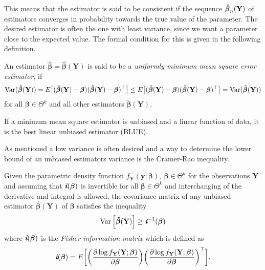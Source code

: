 This means that the estimator is said to be consistent if the sequence $\operatorname{\boldsymbol{\hat{\beta}}}_n(\textbf{Y})$ of estimators converges in probability towards the true value of the parameter. 
The desired estimator is often the one with least variance, since we want a parameter close to the expected value. 
The formal condition for this is given in the following definition.

\begin{definition} 
\label{def:minimum_mean_square_error}
An estimator $\boldsymbol{\hat{\beta}}=\boldsymbol{\hat{\beta}}(\textbf{Y})$ is said to be a \textit{uniformly minimum mean square error estimator}, if
\begin{align*}
    \operatorname{\text{Var}}(\boldsymbol{\hat{\beta}}(\textbf{Y})) = E\big[ (\boldsymbol{\hat{\beta}}(\textbf{Y})-\boldsymbol{\beta})(\boldsymbol{\hat{\beta}}(\textbf{Y})-\boldsymbol{\beta})^\top \big] \leq E\big[ (\boldsymbol{\tilde{\beta}}(\textbf{Y})-\boldsymbol{\beta})(\boldsymbol{\tilde{\beta}}(\textbf{Y})-\boldsymbol{\beta})^\top \big] = \operatorname{\text{Var}}(\boldsymbol{\tilde{\beta}}(\textbf{Y}))
\end{align*} 
for all $\boldsymbol{\beta} \in \Theta^k $ and all other estimators $\boldsymbol{\tilde{\beta}(\textbf{Y})}$.
 \end{definition}
 
If a minimum mean square estimator is unbiased and a linear function of data, it is the best linear unbiased estimator (BLUE).

As mentioned a low variance is often desired and a way to determine the lower bound of an unbiased estimators variance is the Cramer-Rao inequality.
 
 \begin{theorem} 
\label{th:cramerrao_inequality}
Given the parametric density function $f_{\textbf{Y}}(\textbf{y};\boldsymbol{\beta}), \ \boldsymbol{\beta} \in \Theta^k$ for the observations $\textbf{Y}$ and assuming that $\textit{\textbf{i}}(\boldsymbol{\beta})$ is invertible for all $\boldsymbol{\beta} \in \Theta^k$ and interchanging of the derivative and integral is allowed, the covariance matrix of any unbiased estimator $\boldsymbol{\hat{\beta}}(\textbf{Y})$ of $\boldsymbol{\beta}$ satisfies the inequality
\begin{align} \label{eq:cramerrao_inequality}
    \operatorname{\text{Var}} \Big[ \boldsymbol{\hat{\beta}}(\textbf{Y})\Big] \geq \textit{\textbf{i}}^{-1}(\boldsymbol{\beta})
\end{align}
where $\textit{\textbf{i}}(\operatorname{\boldsymbol{\beta}})$ is the \textit{Fisher information matrix} which is defined as
\begin{align*}
    \textit{\textbf{i}}(\boldsymbol{\beta})=E \bigg[ \bigg(\frac{\partial \log f_\textbf{Y}(\textbf{Y};\boldsymbol{\beta})}{\partial \boldsymbol{\beta}} \bigg)\bigg(\frac{\partial \log f_\textbf{Y}(\textbf{Y};\boldsymbol{\beta})}{\partial \boldsymbol{\beta}}\bigg)^\top\bigg].
\end{align*}
\end{theorem}

